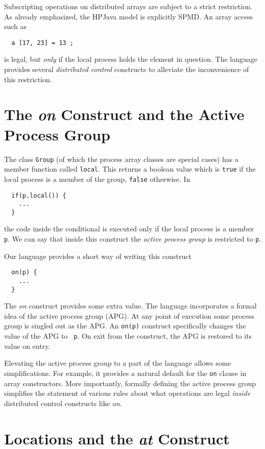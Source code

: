 Subscripting operations on distributed arrays are subject to a strict
restriction.  As already emphasized, the HPJava model is explicitly SPMD.
An array access such as
\small
\begin{verbatim}
  a [17, 23] = 13 ;
\end{verbatim}
\normalsize
is legal, but {\em only} if the local process holds the element in
question.  The language provides several {\em distributed control}
constructs to alleviate the inconvenience of this restriction.


\section{The {\em on} Construct and the Active Process Group\label{on}}

The class {\tt Group} (of which the process array classes are special
cases) has a member function called {\tt local}.  This returns a boolean
value which is {\tt true} if the local process is a member of the
group, {\tt false} otherwise.  In
\small
\begin{verbatim}
  if(p.local()) {
    ...
  }
\end{verbatim}
\normalsize
the code inside the conditional is executed only if the
local process is a member {\tt p}.  We can say that inside this
construct the {\em active process group} is restricted to {\tt p}.

Our language provides a short way of writing this construct
\small
\begin{verbatim}
  on(p) {
    ...
  }
\end{verbatim}
\normalsize
The {\em on} construct provides some extra value.  The language
incorporates a formal idea of the active process group (APG).  At any
point of execution some process group is singled out as the APG.  An
{\tt on(p)} construct specifically changes the value of the APG to {\tt
p}.  On exit from the construct, the APG is restored to its value on
entry.

Elevating the active process group to a part of the language
allows some simplifications.  For example, it provides a natural
default for the {\tt on} clause in array constructors.
More importantly, formally defining the active process group
simplifies the statement of various rules about what operations are legal
{\em inside} distributed control constructs like {\em on}.

\section{Locations and the {\em at} Construct\label{locations}}

